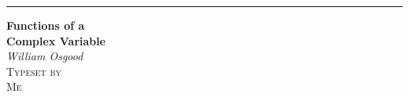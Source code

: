 \documentclass[letter, 11pt]{book} %
\begin{document}
	\begin{center}
	\raggedleft %
	\rule{1pt}{\textheight} %
	\hspace{0.05\textwidth} %
	\parbox[b]{0.75\textwidth}{ %
		
		{\Huge\bfseries Functions of a \\[0.5\baselineskip] Complex Variable }\\[2\baselineskip] %
		{\Large\textit{William Osgood}}\\[4\baselineskip] %
		{\large\textsc{Typeset by\\ [0.5\baselineskip] Me}} %
		\vspace{0.5\textheight} %
	}
	\end{center}
\end{document}
